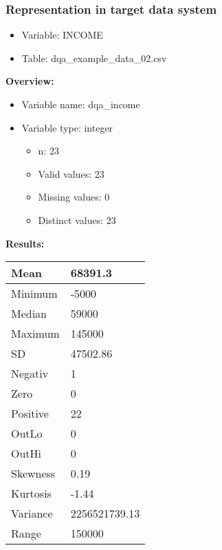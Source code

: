 \documentclass[
]{article}
\providecommand{\tightlist}{%
  \setlength{\itemsep}{0pt}\setlength{\parskip}{0pt}}
\begin{document}
\newpage

\hypertarget{representation-in-target-data-system-7}{%
\subsubsection{\texorpdfstring{Representation in \textbf{target} data
system}{Representation in target data system}}\label{representation-in-target-data-system-7}}

\begin{itemize}
\tightlist
\item
  Variable: INCOME
\item
  Table: dqa\_example\_data\_02.csv
\end{itemize}

\textbf{Overview:}

\begin{itemize}
\tightlist
\item
  Variable name: dqa\_income
\item
  Variable type: integer

  \begin{itemize}
  \tightlist
  \item
    n: 23
  \item
    Valid values: 23
  \item
    Missing values: 0
  \item
    Distinct values: 23
  \end{itemize}
\end{itemize}

\textbf{Results:}\\

\begin{table}[H]
\centering
\begin{tabular}{l|l}
\hline
Mean & 68391.3\\
\hline
Minimum & -5000\\
\hline
Median & 59000\\
\hline
Maximum & 145000\\
\hline
SD & 47502.86\\
\hline
Negativ & 1\\
\hline
Zero & 0\\
\hline
Positive & 22\\
\hline
OutLo & 0\\
\hline
OutHi & 0\\
\hline
Skewness & 0.19\\
\hline
Kurtosis & -1.44\\
\hline
Variance & 2256521739.13\\
\hline
Range & 150000\\
\hline
\end{tabular}
\end{table}
\end{document}
